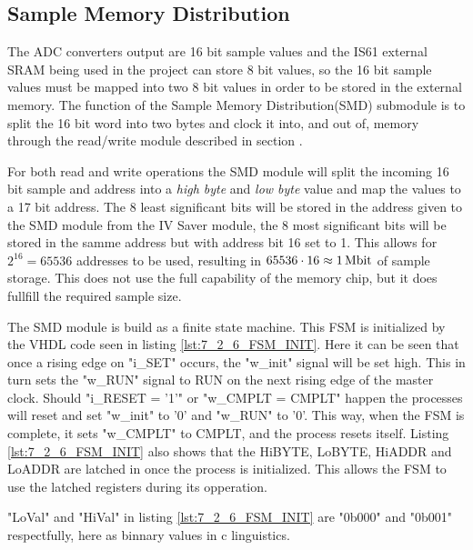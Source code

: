 \subsection{Sample Memory Distribution} \label{subsec:Sample_Memory_Distribution} 
The ADC converters output are 16 bit sample values and the IS61 external SRAM being used in the project can store 8 bit values, so the 16 bit sample values must be mapped into two 8 bit values in order to be stored in the external memory. The function of the Sample Memory Distribution(SMD) submodule is to split the 16 bit word into two bytes and clock it into, and out of, memory through the read/write module described in section .

For both read and write operations the SMD module will split the incoming 16 bit sample and address into a \textit{high byte} and \textit{low byte} value and map the values to a 17 bit address. The 8 least significant bits will be stored in the address given to the SMD module from the IV Saver module, the 8 most significant bits will be stored in the samme address but with address bit 16 set to 1. This allows for $2^{16} = 65536$ addresses to be used, resulting in $65536\cdot16 \approx \SIQ{1}{\mega\bit}$ of sample storage. This does not use the full capability of the memory chip, but it does fullfill the required sample size. 

The SMD module is build as a finite state machine. This FSM is initialized by the VHDL code seen in listing \ref{lst:7_2_6_FSM_INIT}. Here it can be seen that once a rising edge on "i\_SET" occurs, the "w\_init" signal will be set high. This in turn sets the "w\_RUN" signal to RUN on the next rising edge of the  master clock. Should "i\_RESET = '1'" or "w\_CMPLT = CMPLT" happen the processes will reset and set "w\_init" to '0' and "w\_RUN" to '0'. This way, when the FSM is complete, it sets "w\_CMPLT" to CMPLT, and the process resets itself. Listing \ref{lst:7_2_6_FSM_INIT} also shows that the HiBYTE, LoBYTE, HiADDR and LoADDR are latched in once the process is initialized. This allows the FSM to use the latched registers during its opperation. 

"LoVal" and "HiVal" in listing \ref{lst:7_2_6_FSM_INIT} are "0b000" and "0b001" respectfully, here as binnary values in c linguistics.

 

